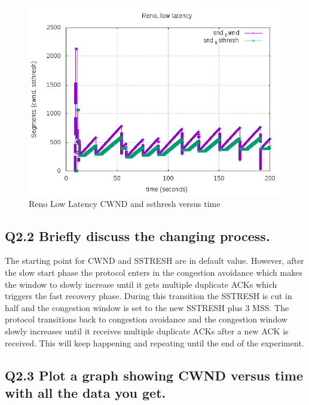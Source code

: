 \documentclass{article}
\begin{document}
\begin{figure}[H]
\centering
\includegraphics[width=12cm]{figures/RenoLLcwnd.png}
\caption{Reno Low Latency CWND and ssthresh versus time}
\end{figure}

\subsection{Q2.2 Briefly discuss the changing process.}

The starting point for CWND and SSTRESH are in default value. However, after the slow start phase the protocol enters in the congestion avoidance which makes the window to slowly increase until it gets multiple duplicate ACKs which triggers the fast recovery phase.  During this transition the SSTRESH is cut in half and the congestion window is set to the new SSTRESH plus 3 MSS. The protocol transitions back to congestion avoidance and the congestion window slowly increases until it receives multiple duplicate ACKs after a new ACK is received. This will keep happening and repeating until the end of the experiment.


\subsection{Q2.3 Plot a graph showing CWND versus time with all the data
you get.}
\end{document}
